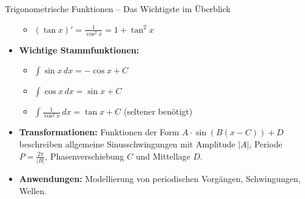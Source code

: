 \begin{kurzknappumgebung}{Trigonometrische Funktionen – Das Wichtigste im Überblick}
\begin{itemize}
\begin{itemize}
            \item $(\tan x)' = \frac{1}{\cos^2 x} = 1 + \tan^2 x$
        \end{itemize}
    \item \textbf{Wichtige Stammfunktionen:}
        \begin{itemize}
            \item $\int \sin x \,dx = -\cos x + C$
            \item $\int \cos x \,dx = \sin x + C$
            \item $\int \frac{1}{\cos^2 x} \,dx = \tan x + C$ (seltener benötigt)
        \end{itemize}
    \item \textbf{Transformationen:} Funktionen der Form $A \cdot \sin(B(x-C)) + D$ beschreiben allgemeine Sinusschwingungen mit Amplitude $|A|$, Periode $P=\frac{2\pi}{|B|}$, Phasenverschiebung $C$ und Mittellage $D$.
    \item \textbf{Anwendungen:} Modellierung von periodischen Vorgängen, Schwingungen, Wellen.
\end{itemize}
\end{kurzknappumgebung}

